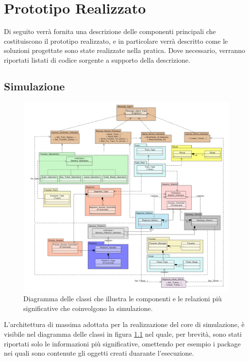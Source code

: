 \newpage
\chapter {Prototipo Realizzato}

Di seguito verrà fornita una descrizione delle componenti principali che costituiscono il prototipo realizzato, e in particolare verrà descritto come le soluzioni progettate sono state realizzate nella pratica. Dove necessario, verranno riportati listati di codice sorgente a supporto della descrizione.

\section{Simulazione}

	\begin{figure}[htbp]
		\includegraphics[scale=0.42,trim= 90mm 0mm 0mm 0mm]{imgs/Simplified_Class_Diagram.pdf}
		\caption{\footnotesize{Diagramma delle classi che illustra le componenti e le relazioni più significative che coinvolgono la simulazione.}}
		\label{img:class_diagram}
	\end{figure}

L'architettura di massima adottata per la realizzazione del core di simulazione, è visibile nel diagramma delle classi in figura \ref{img:class_diagram} nel quale, per brevità, sono stati riportati solo le informazioni più significative, omettendo per esempio i package nei quali sono contenute gli oggetti creati duarante l'esecuzione.
	

